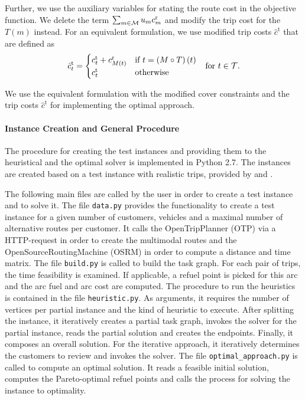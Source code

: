 Further, we use the auxiliary variables for stating the route cost in the objective function. We delete the term $\sum_{m\in\mathcal{M}} u_mc^{\operatorname{r}}_m$ and modify the trip cost for the $T(m)$ instead. For an equivalent formulation, we use modified trip costs $\hat{c}^{\operatorname{t}}$ that are defined as
\begin{align*}
	\hat{c}^{\operatorname{t}}_t = \begin{cases} c^{\operatorname{t}}_t + c^{\operatorname{r}}_{M(t)} & \text{if } t = \left(M\circ T\right)(t) \\ c^{\operatorname{t}}_t & \text{otherwise} \end{cases} && \text{for } t\in\mathcal{T}.
\end{align*}

We use the equivalent formulation with the modified cover constraints and the trip costs $\hat{c}^{\operatorname{t}}$ for implementing the optimal approach.

\paragraph{Instance Creation and General Procedure} \parfill

The procedure for creating the test instances and providing them to the heuristical and the optimal solver is implemented in Python 2.7. The instances are created based on a test instance with realistic trips, provided by \cite{Kaiser} and \cite{Knoll}.

The following main files are called by the user in order to create a test instance and to solve it. The file \texttt{data.py} provides the functionality to create a test instance for a given number of customers, vehicles and a maximal number of alternative routes per customer. It calls the OpenTripPlanner (OTP) via a HTTP-request in order to create the multimodal routes and the OpenSourceRoutingMachine (OSRM) in order to compute a distance and time matrix. The file \texttt{build.py} is called to build the task graph. For each pair of trips, the time feasibility is examined. If applicable, a refuel point is picked for this arc and the arc fuel and arc cost are computed. The procedure to run the heuristics is contained in the file \texttt{heuristic.py}. As arguments, it requires the number of vertices per partial instance and the kind of heuristic to execute. After splitting the instance, it iteratively creates a partial task graph, invokes the solver for the partial instance, reads the partial solution and creates the endpoints. Finally, it composes an overall solution. For the iterative approach, it iteratively determines the customers to review and invokes the solver. The file \texttt{optimal\_approach.py} is called to compute an optimal solution. It reads a feasible initial solution, computes the Pareto-optimal refuel points and calls the process for solving the instance to optimality.

